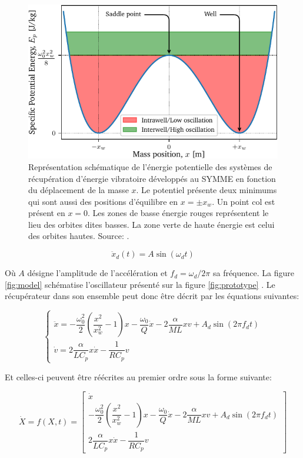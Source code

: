 \documentclass[a4paper, french, 12pt, titlepage]{article}
\begin{document}
\begin{figure}
  \begin{center}
    \includegraphics[width = .6\textwidth]{images/potential}
  \end{center}
  \caption{Représentation schématique de l'énergie potentielle des systèmes de récupération d'énergie vibratoire développés au SYMME en fonction du déplacement de la masse $x$.
    Le potentiel présente deux minimums qui sont aussi des positions d'équilibre en $x = \pm x_w$.
    Un point col est présent en $x = 0$.
    Les zones de basse énergie rouges représentent le lieu des orbites dites basses.
    La zone verte de haute énergie est celui des orbites hautes.  Source:  \cite{lcharleuxHDR}.}
  \label{fig:lc_potential}
\end{figure}

\begin{equation}
  \ddot x_d(t) = A \sin (\omega_d t)
\end{equation}

\noindent Où $A$ désigne l'amplitude de l'accélération et $f_d = \omega_d / 2 \pi$ sa fréquence.
La figure \ref{fig:model} schématise l'oscillateur présenté sur la figure \ref{fig:prototype} \cite{csaintmartin2023preprint}.
Le récupérateur dans son ensemble peut donc être décrit par les équations suivantes:

\begin{equation}
  \left\{
  \begin{array}{ll}
    \ddot{x} = -\dfrac{\omega_0^2}{2} \left( \dfrac{x^2}{x_w^2} - 1 \right) x - \dfrac{\omega_0}{Q} \dot{x} - 2 \dfrac{\alpha}{M L} x v + A_d \sin(2 \pi f_d t) \\[5mm]
    \dot{v} =   2 \dfrac{\alpha}{LC_p} x \dot{x} - \dfrac{1}{R C_p} v
  \end{array}
  \right.
  \label{eq:ode}
\end{equation}

\noindent Et celles-ci peuvent être réécrites au premier ordre sous la forme suivante:

\begin{equation}
  \dot X = f(X, t)
  =
  \begin{bmatrix}
    \dot x                                                                                                                                                       \\
    -\dfrac{\omega_0^2}{2} \left( \dfrac{x^2}{x_w^2} - 1 \right) x - \dfrac{\omega_0}{Q} \dot{x} - 2 \dfrac{\alpha}{M L} x v + A_d \sin \left(2 \pi f_d t\right) \\
    2 \dfrac{\alpha}{LC_p} x \dot{x} - \dfrac{1}{R C_p} v
  \end{bmatrix}
  \label{eq:ode2}
\end{equation}
\end{document}
